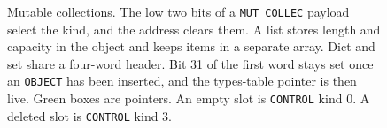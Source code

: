 \begin{figure}[t]
\caption{Mutable collections.
The low two bits of a \texttt{MUT\_COLLEC} payload select the kind, and the address clears them.
A list stores length and capacity in the object and keeps items in a separate array.
Dict and set share a four-word header.
Bit 31 of the first word stays set once an \texttt{OBJECT} has been inserted, and the types-table pointer is then live.
Green boxes are pointers.
An empty slot is \texttt{CONTROL} kind 0.
A deleted slot is \texttt{CONTROL} kind 3.}
\label{fig:collections}
\end{figure}
